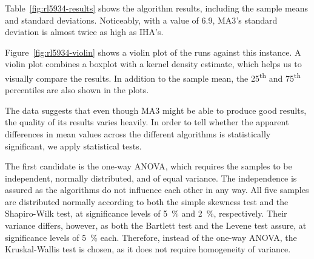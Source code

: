 \documentclass[thesis.tex]{subfiles}
\begin{document}
\subsubsection{}
   \renewcommand{\CurrentInstance}{\Instance{rl5934}}
   \renewcommand{\CurrentInstanceFileEscaped}{rl5934}
   \renewcommand{\CurrentInstanceTexEscaped}{rl5934}



Table~\vref{fig:rl5934-results} shows the algorithm results, including the sample means and standard deviations. Noticeably, with a value of $6.9$, \gls{MA3}'s standard deviation is almost twice as high as \gls{IHA}'s. 

Figure~\vref{fig:rl5934-violin} shows a violin plot of the runs against this instance. A violin plot combines a boxplot with a kernel density estimate, which helps us to visually compare the results. In addition to the sample mean, the 25\textsuperscript{th} and 75\textsuperscript{th} percentiles are also shown in the plots.

The data suggests that even though \gls{MA3} might be able to produce good results, the quality of its results varies heavily. In order to tell whether the apparent differences in mean values across the different algorithms is statistically significant, we apply statistical tests.

The first candidate is the one-way \gls{ANOVA}, which requires the samples to be independent, normally distributed, and of equal variance. The independence is assured as the algorithms do not influence each other in any way. All five samples are distributed normally according to both the simple skewness test and the Shapiro-Wilk test, at significance levels of \SI{5}{\percent} and \SI{2}{\percent}, respectively. Their variance differs, however, as both the Bartlett test and the Levene test assure, at significance levels of \SI{5}{\percent} each. Therefore, instead of the one-way \gls{ANOVA}, the Kruskal-Wallis test is chosen, as it does not require homogeneity of variance.
\end{document}
